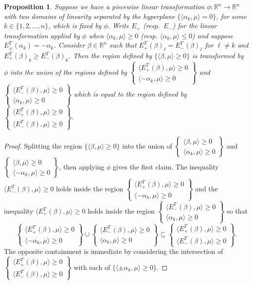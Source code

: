 \documentclass{amsart}
\newtheorem{proposition}[theorem]{Proposition}
\numberwithin{theorem}{section}
\newcommand{\RR}{\mathbb{R}}
\begin{document}
  \begin{proposition}
    Suppose we have a piecewise linear transformation $\phi:\RR^n\to\RR^n$ with two domains of linearity separated by the hyperplane $\{\langle\alpha_k,\mu\rangle = 0\}$, for some $k\in\{1,2,\ldots,n\}$, which is fixed by $\phi$.
    Write $E_+$ (resp.~$E_-$) for the linear transformation applied by $\phi$ when $\langle\alpha_k,\mu\rangle\ge0$ (resp. $\langle\alpha_k,\mu\rangle\le 0$) and suppose $E_\pm^T(\alpha_k)=-\alpha_k$.
    Consider $\beta\in\RR^n$ such that $E_+^T(\beta)_\ell=E_-^T(\beta)_\ell$ for $\ell\ne k$ and $E_+^T(\beta)_k\ge E_-^T(\beta)_k$.
    Then the region defined by $\{\langle\beta,\mu\rangle\ge0\}$ is transformed by $\phi$ into the union of the regions defined by $\left\{\substack{\langle E_+^T(\beta),\mu\rangle \ge 0\\ \langle -\alpha_k,\mu\rangle \ge 0}\right\}$ and $\left\{\substack{\langle E_-^T(\beta),\mu\rangle \ge 0\\ \langle \alpha_k,\mu\rangle \ge 0}\right\}$ which is equal to the region defined by $\left\{\substack{\langle E_+^T(\beta),\mu\rangle \ge 0\\ \langle E_-^T(\beta),\mu\rangle \ge 0}\right\}$.
  \end{proposition}
  \begin{proof}
    Splitting the region $\{\langle\beta,\mu\rangle\ge0\}$ into the union of $\left\{\substack{\langle \beta,\mu\rangle \ge 0\\ \langle \alpha_k,\mu\rangle \ge 0}\right\}$ and $\left\{\substack{\langle \beta,\mu\rangle \ge 0\\ \langle -\alpha_k,\mu\rangle \ge 0}\right\}$, then applying $\phi$ gives the first claim.
    The inequality $\langle E_-^T(\beta),\mu\rangle \ge 0$ holds inside the region $\left\{\substack{\langle E_+^T(\beta),\mu\rangle \ge 0\\ \langle -\alpha_k,\mu\rangle \ge 0}\right\}$ and the inequality $\langle E_+^T(\beta),\mu\rangle \ge 0$ holds inside the region $\left\{\substack{\langle E_-^T(\beta),\mu\rangle \ge 0\\ \langle \alpha_k,\mu\rangle \ge 0}\right\}$ so that 
    \[\left\{\substack{\langle E_+^T(\beta),\mu\rangle \ge 0\\ \langle -\alpha_k,\mu\rangle \ge 0}\right\} \cup \left\{\substack{\langle E_-^T(\beta),\mu\rangle \ge 0\\ \langle \alpha_k,\mu\rangle \ge 0}\right\} \subseteq \left\{\substack{\langle E_+^T(\beta),\mu\rangle \ge 0\\ \langle E_-^T(\beta),\mu\rangle \ge 0}\right\}.\]
    The opposite containment is immediate by considering the intersection of $\left\{\substack{\langle E_+^T(\beta),\mu\rangle \ge 0\\ \langle E_-^T(\beta),\mu\rangle \ge 0}\right\}$ with each of $\{\langle\pm\alpha_k,\mu\rangle\ge0\}$. 
  \end{proof}
\end{document}
